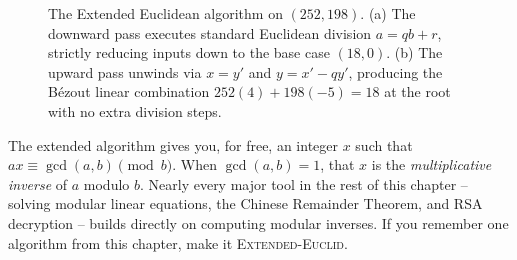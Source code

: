 \begin{figure}[H]
\caption{The Extended Euclidean algorithm on $(252,198)$. (a) The downward pass
executes standard Euclidean division $a = qb + r$, strictly reducing inputs down
to the base case $(18,0)$. (b) The upward pass unwinds via $x = y'$ and
$y = x' - qy'$, producing the B\'ezout linear combination $252(4) + 198(-5) = 18$
at the root with no extra division steps.}
\label{ch30:fig-exteuclid}
\end{figure}

\begin{focusbox}
The extended algorithm gives you, for free, an integer $x$ such that $ax \equiv
\gcd(a,b) \pmod{b}$. When $\gcd(a,b)=1$, that $x$ is the \emph{multiplicative inverse} of
$a$ modulo $b$. Nearly every major tool in the rest of this chapter -- solving
modular linear equations, the Chinese Remainder Theorem, and RSA decryption --
builds directly on computing modular inverses. If you remember one algorithm from this chapter, make
it \textsc{Extended-Euclid}.
\end{focusbox}

